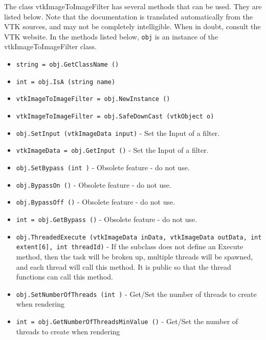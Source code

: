 The class vtkImageToImageFilter has several methods that can be used.
  They are listed below.
Note that the documentation is translated automatically from the VTK sources,
and may not be completely intelligible.  When in doubt, consult the VTK website.
In the methods listed below, \verb|obj| is an instance of the vtkImageToImageFilter class.
\begin{itemize}
\item  \verb|string = obj.GetClassName ()|

\item  \verb|int = obj.IsA (string name)|

\item  \verb|vtkImageToImageFilter = obj.NewInstance ()|

\item  \verb|vtkImageToImageFilter = obj.SafeDownCast (vtkObject o)|

\item  \verb|obj.SetInput (vtkImageData input)| -  Set the Input of a filter. 

\item  \verb|vtkImageData = obj.GetInput ()| -  Set the Input of a filter. 

\item  \verb|obj.SetBypass (int )| -  Obsolete feature - do not use.

\item  \verb|obj.BypassOn ()| -  Obsolete feature - do not use.

\item  \verb|obj.BypassOff ()| -  Obsolete feature - do not use.

\item  \verb|int = obj.GetBypass ()| -  Obsolete feature - do not use.

\item  \verb|obj.ThreadedExecute (vtkImageData inData, vtkImageData outData, int extent[6], int threadId)| -  If the subclass does not define an Execute method, then the task
 will be broken up, multiple threads will be spawned, and each thread
 will call this method. It is public so that the thread functions
 can call this method.

\item  \verb|obj.SetNumberOfThreads (int )| -  Get/Set the number of threads to create when rendering

\item  \verb|int = obj.GetNumberOfThreadsMinValue ()| -  Get/Set the number of threads to create when rendering


\end{itemize}
